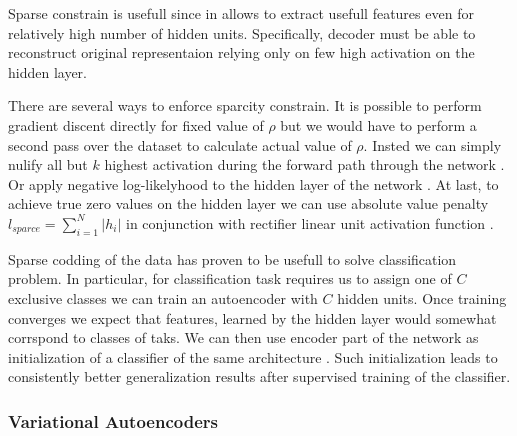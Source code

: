Sparse constrain is usefull since in allows to extract usefull features even for relatively high number of hidden units. Specifically, decoder must be able to reconstruct original representaion relying only on few high activation on the hidden layer.

There are several ways to enforce sparcity constrain.
It is possible to perform gradient discent directly for fixed value of $\hat{\rho}$ but we would have to perform a second pass over the dataset to calculate actual value of $\rho$. Insted we can simply nulify all but $k$ highest activation during the forward path through the network \cite{Kulkarni2015}.
Or apply negative log-likelyhood to the hidden layer of the network \cite{Zhao2015}.
At last, to achieve true zero values on the hidden layer we can use absolute value penalty $l_{sparce}=\sum_{i=1}^N |h_i|$ in conjunction with rectifier linear unit activation function \cite{Glorot2011}.

Sparse codding of the data has proven to be usefull to solve classification problem.
In particular, for classification task requires us to assign one of $C$ exclusive classes we can train an autoencoder with $C$ hidden units. Once training converges we expect that features, learned by the hidden layer would somewhat corrspond to classes of taks. We can then use encoder part of the network as initialization of a classifier of the same architecture \cite{Masci2011}.
Such initialization leads to consistently better generalization results after supervised training of the classifier.

\subsubsection{Variational Autoencoders}\label{ch:vae}



